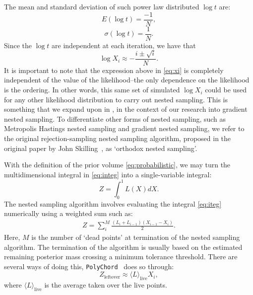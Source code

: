 The mean and standard deviation of such power law distributed $\log t$ are:
%
\begin{equation}
   E(\log t)= \frac{-1}{N},
\end{equation}
%
\begin{equation}
   \sigma (\log t)= \frac{1}{N}.
\end{equation}
%
Since the $\log t$ are independent at each iteration, we have that 
%
\begin{equation}
   \log X_i \approx - \frac{i \pm \sqrt{i}}{N}.
\label{eq:xi}
\end{equation}
%
It is important to note that the expression above in \cref{eq:xi} is completely independent of the value of the likelihood--the only dependence on the likelihood is the ordering. In other words, this same set of simulated $\log X_i$ could be used for any other likelihood distribution to carry out nested sampling. This is something that we expand upon in , in the context of our research into gradient nested sampling. To differentiate other forms of nested sampling, such as Metropolis Hastings nested sampling and gradient nested sampling, we refer to the original rejection-sampling nested sampling algorithm, proposed in the original paper by John Skilling~\cite{10.1214/06-BA127}, as `orthodox nested sampling'. 


With the definition of the prior volume \cref{eq:probabilistic}, we may turn the multidimensional integral in \cref{eq:integ} into a single-variable integral:
%
\begin{equation}
    Z = \int^1_0 L(X) dX.
\label{eq:iteg}
\end{equation}
%
The nested sampling algorithm involves evaluating the integral \cref{eq:iteg} numerically using a weighted sum such as:
%
\begin{align}
Z = \sum_i^M \frac{(L_i+L_{i-1})(X_{i-1}-X_{i})}{2}.
\end{align}
%
Here, $M$ is the number of `dead points' at termination of the nested sampling algorithm. The termination of the algorithm is usually based on the estimated remaining posterior mass crossing a minimum tolerance threshold. There are several ways of doing this, \texttt{PolyChord}~\cite{Handley_2015} does so through:
%
\begin{equation}
    Z_{\mathrm{leftover}} \approx \langle L \rangle_{\mathrm{live}} X_i,
\end{equation}
%
where $\langle L \rangle_{\mathrm{live}}$ is the average taken over the live points. 

